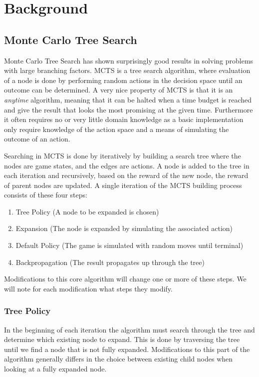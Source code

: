\documentclass[10pt,a4paper]{article}
\begin{document}
\section{Background}
\subsection{Monte Carlo Tree Search}

Monte Carlo Tree Search has shown surprisingly good results in solving problems with large branching factors. MCTS is a tree search algorithm, where evaluation of a node is done by performing random actions in the decision space until an outcome can be determined. A very nice property of MCTS is that it is an \emph{anytime} algorithm, meaning that it can be halted when a time budget is reached and give the result that looks the most promising at the given time. Furthermore it often requires no or very little domain knowledge as a basic implementation only require knowledge of the action space and a means of simulating the outcome of an action.


Searching in MCTS is done by iteratively by building a search tree where the nodes are game states, and the edges are actions. A node is added to the tree in each iteration and recursively, based on the reward of the new node, the reward of parent nodes are updated.
A single iteration of the MCTS building process consists of these four steps:
\begin{enumerate}
\item Tree Policy (A node to be expanded is chosen)
\item Expansion (The node is expanded by simulating the associated action)
\item Default Policy (The game is simulated with random moves until terminal)
\item Backpropagation (The result propagates up through the tree)
\end{enumerate}
Modifications to this core algorithm will change one or more of these steps. We will note for each modification what steps they modify.
\subsubsection{Tree Policy}
\label{treepolicy}
In the beginning of each iteration the algorithm must search through the tree and determine which existing node to expand. This is done by traversing the tree until we find a node that is not fully expanded. Modifications to this part of the algorithm generally differs in the choice between existing child nodes when looking at a fully expanded node.
\end{document}
